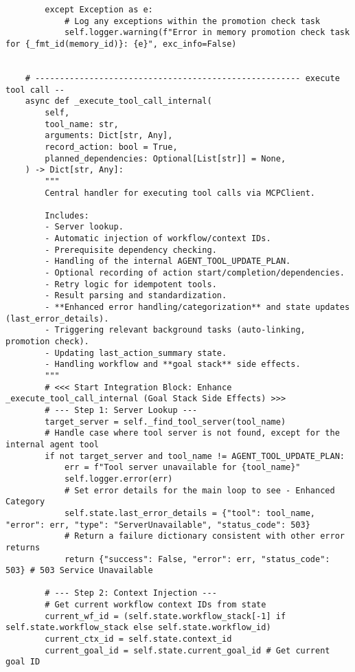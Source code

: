 \documentclass[12pt,a4paper]{article}
\begin{document}
\begin{pageablecode}
\begin{verbatim}
        except Exception as e:
            # Log any exceptions within the promotion check task
            self.logger.warning(f"Error in memory promotion check task for {_fmt_id(memory_id)}: {e}", exc_info=False)


    # ------------------------------------------------------ execute tool call --
    async def _execute_tool_call_internal(
        self,
        tool_name: str,
        arguments: Dict[str, Any],
        record_action: bool = True,
        planned_dependencies: Optional[List[str]] = None,
    ) -> Dict[str, Any]:
        """
        Central handler for executing tool calls via MCPClient.

        Includes:
        - Server lookup.
        - Automatic injection of workflow/context IDs.
        - Prerequisite dependency checking.
        - Handling of the internal AGENT_TOOL_UPDATE_PLAN.
        - Optional recording of action start/completion/dependencies.
        - Retry logic for idempotent tools.
        - Result parsing and standardization.
        - **Enhanced error handling/categorization** and state updates (last_error_details).
        - Triggering relevant background tasks (auto-linking, promotion check).
        - Updating last_action_summary state.
        - Handling workflow and **goal stack** side effects.
        """
        # <<< Start Integration Block: Enhance _execute_tool_call_internal (Goal Stack Side Effects) >>>
        # --- Step 1: Server Lookup ---
        target_server = self._find_tool_server(tool_name)
        # Handle case where tool server is not found, except for the internal agent tool
        if not target_server and tool_name != AGENT_TOOL_UPDATE_PLAN:
            err = f"Tool server unavailable for {tool_name}"
            self.logger.error(err)
            # Set error details for the main loop to see - Enhanced Category
            self.state.last_error_details = {"tool": tool_name, "error": err, "type": "ServerUnavailable", "status_code": 503}
            # Return a failure dictionary consistent with other error returns
            return {"success": False, "error": err, "status_code": 503} # 503 Service Unavailable

        # --- Step 2: Context Injection ---
        # Get current workflow context IDs from state
        current_wf_id = (self.state.workflow_stack[-1] if self.state.workflow_stack else self.state.workflow_id)
        current_ctx_id = self.state.context_id
        current_goal_id = self.state.current_goal_id # Get current goal ID


\end{verbatim}
\end{pageablecode}
\end{document}
